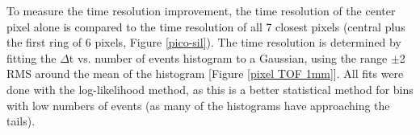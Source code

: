 \documentclass[twocolumn,aps,prd,reprint]{revtex4-1}
\begin{document}
To measure the time resolution improvement, the time resolution of the center pixel alone is compared to the time resolution of all 7 closest pixels (central plus the first ring of 6 pixels, Figure \ref{pico-sil}). The time resolution is determined by fitting the $\Delta$t vs. number of events histogram to a Gaussian, using the range $\pm$2 RMS around the mean of the histogram [Figure \ref{pixel TOF 1mm}]. All fits were done with the log-likelihood method, as this is a better statistical method for bins with low numbers of events (as many of the histograms have approaching the tails).

\begin{figure}[!htbp]

\end{figure}
\end{document}
